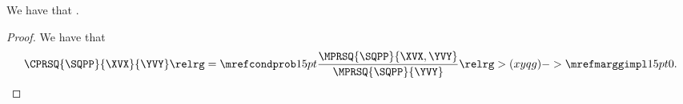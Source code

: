 \begin{proposition}
  We have that \sqpmarggimplcondprop.%
\end{proposition}

\begin{proof}
  We have that
  $$\CPRSQ{\SQPP}{\XVX}{\YVY} \relrg = {\mrefcondprob} 15pt \frac{\MPRSQ{\SQPP}{\XVX, \YVY}}{\MPRSQ{\SQPP}{\YVY}}
  \relrg > {(xyqg)->\mrefmarggimpl} 15pt 0.$$%
\end{proof}
